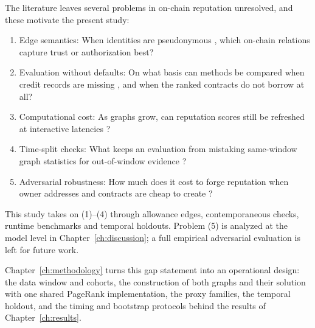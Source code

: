
The literature leaves several problems in on-chain reputation unresolved, and these motivate the present study:

\begin{enumerate}
\item Edge semantics: When identities are pseudonymous \parencite{lin2024whoiswho}, which on-chain relations capture trust or authorization best?
\item Evaluation without defaults: On what basis can methods be compared when credit records are missing \parencite{do2023hodgerank}, and when the ranked contracts do not borrow at all?
\item Computational cost: As graphs grow, can reputation scores still be refreshed at interactive latencies \parencite{langville2006pagerank}?
\item Time-split checks: What keeps an evaluation from mistaking same-window graph statistics for out-of-window evidence \parencite{cronbach1955construct}?
\item Adversarial robustness: How much does it cost to forge reputation when owner addresses and contracts are cheap to create \parencite{douceur2002sybil}?
\end{enumerate}

This study takes on (1)--(4) through allowance edges, contemporaneous checks, runtime benchmarks and temporal holdouts. Problem (5) is analyzed at the model level in Chapter~\ref{ch:discussion}; a full empirical adversarial evaluation is left for future work.

Chapter~\ref{ch:methodology} turns this gap statement into an operational design: the data window and cohorts, the construction of both graphs and their solution with one shared PageRank implementation, the proxy families, the temporal holdout, and the timing and bootstrap protocols behind the results of Chapter~\ref{ch:results}.
